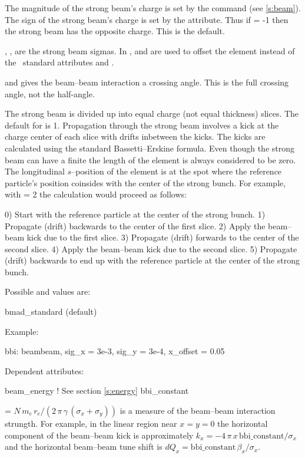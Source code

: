 The magnitude of the strong beam's charge is set by the 
command (see \ref{s:beam}).  The sign of the strong beam's charge is
set by the  attribute.  Thus if  = -1 then the
strong beam has the opposite charge. This is the default.

, ,  are the strong beam sigmas. 
In \bmad,  and  are used to offset the
 element instead of the \mad\ standard attributes
 and .

 and  gives the beam--beam interaction a
crossing angle. This is the full crossing angle, not the half-angle.

The strong beam is divided up into  equal charge (not
equal thickness) slices. The default for  is 1.
Propagation through the strong beam involves a kick at the charge
center of each slice with drifts inbetween the kicks. The kicks are
calculated using the standard Bassetti--Erskine formula.  Even though
the strong beam can have a finite  the length of the element
is always considered to be zero. The longitudinal $s$--position of the
 element is at the spot where the reference particle's
position coinsides with the center of the strong bunch. For example,
with  = 2 the calculation would proceed as follows:
\begin{example}
  0) Start with the reference particle at the center of the strong bunch.
  1) Propagate (drift) backwards to the center of the first slice.
  2) Apply the beam--beam kick due to the first slice.
  3) Propagate (drift) forwards to the center of the second slice.
  4) Apply the beam--beam kick due to the second slice.
  5) Propagate (drift) backwards to end up with the reference particle
     at the center of the strong bunch.
\end{example}

\vskip0.2in \noindent
Possible  and  values are:
\vskip 0.01in
\begin{example}
   bmad\_standard  (default) 
\end{example}

\vskip0.2in \noindent
Example:
\begin{example}
  bbi: beambeam, sig\_x = 3e-3, sig\_y = 3e-4, x\_offset = 0.05
\end{example}

\vskip0.2in \noindent
Dependent attributes:
\begin{example}
  beam\_energy  ! See section \ref{s:energy}
  bbi\_constant 
\end{example}
 = $N \, m_e \, r_e / (2 \, \pi \, \gamma \, (\sigma_x + \sigma_y))$ 
is a measure of the beam--beam interaction strungth. For example,
in the linear region near $x = y = 0$ the horizontal component of the
beam--beam kick is approximately 
$k_x = -4\, \pi \, x \, \mbox{bbi\_constant} / \sigma_x$ and the
horizontal beam--beam tune shift is 
$dQ_x = \mbox{bbi\_constant} \, \beta_x / \sigma_x$.

